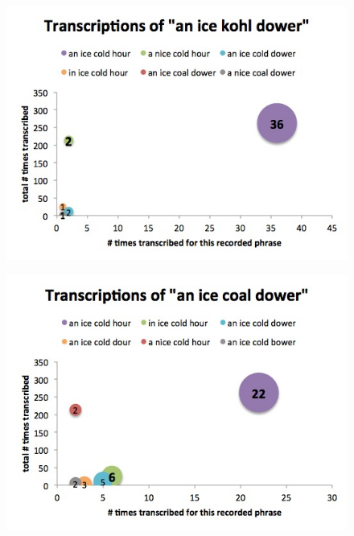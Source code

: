 \begin{figure}[h]
\begin{center}
\includegraphics[width=\piechartwidth]{bubbleChartTranscriptionFrequency_anIceKohlDower.jpg}
\captionfonts
\caption[Most common transcriptions for the recorded phrase "anIceKohlDower"]{}
\label{bubbleChart:anIceKohlDower}
\end{center}
\end{figure}

\begin{figure}[h]
\begin{center}
\includegraphics[width=\piechartwidth]{bubbleChartTranscriptionFrequency_an_IceCoalDower.jpg}
\captionfonts
\caption[Most common transcriptions for the recorded phrase "an_IceCoalDower"]{}
\label{bubbleChart:an_IceCoalDower}
\end{center}
\end{figure}


